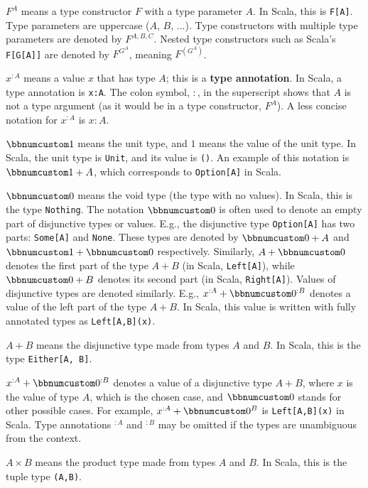 $F^{A}$ means a type constructor $F$ with a type parameter $A$.
In Scala, this is \lstinline!F[A]!. Type parameters are uppercase
($A$, $B$, ...). Type constructors with multiple type parameters
are denoted by $F^{A,B,C}$. Nested type constructors such as Scala\textsf{'}s
\lstinline!F[G[A]]! are denoted by $F^{G^{A}}$, meaning $F^{(G^{A})}$.

$x^{:A}$ means a value $x$ that has type $A$; this is a \textbf{type
annotation}. In Scala, a type annotation is \lstinline!x:A!. The
colon symbol, $:$, in the superscript shows that $A$ is not a type
argument (as it would be in a type constructor, $F^{A}$). A less
concise notation for $x^{:A}$ is $x:A$.

$\bbnum 1$ means the unit type, and $1$ means
the value of the unit type. In Scala, the unit type is \lstinline!Unit!,
and its value is \lstinline!()!. An example of this notation is $\bbnum 1+A$,
which corresponds to \lstinline!Option[A]! in Scala.

$\bbnum 0$ means the void type (the type with no
values). In Scala, this is the type \lstinline!Nothing!. The notation
$\bbnum 0$ is often used to denote an empty part of disjunctive types
or values. E.g., the disjunctive type \lstinline!Option[A]! has two
parts: \lstinline!Some[A]! and \lstinline!None!. These types are
denoted by $\bbnum 0+A$ and $\bbnum 1+\bbnum 0$ respectively. Similarly,
$A+\bbnum 0$ denotes the first part of the type $A+B$ (in Scala,
\lstinline!Left[A]!), while $\bbnum 0+B$ denotes its second part
(in Scala, \lstinline!Right[A]!). Values of disjunctive types are
denoted similarly. E.g., $x^{:A}+\bbnum 0^{:B}$ denotes a value of
the left part of the type $A+B$. In Scala, this value is written
with fully annotated types as \lstinline!Left[A,B](x)!.

$A+B$ means the disjunctive type made from types $A$ and $B$. In
Scala, this is the type \texttt{}\lstinline!Either[A, B]!.

$x^{:A}+\bbnum 0^{:B}$ denotes a value of a disjunctive type $A+B$,
where $x$ is the value of type $A$, which is the chosen case, and
$\bbnum 0$ stands for other possible cases. For example, $x^{:A}+\bbnum 0^{B}$
is \lstinline!Left[A,B](x)! in Scala. Type annotations $^{:A}$ and
$^{:B}$ may be omitted if the types are unambiguous from the context.

$A\times B$ means the product type made from types $A$ and $B$.
In Scala, this is the tuple type \lstinline!(A,B)!.

